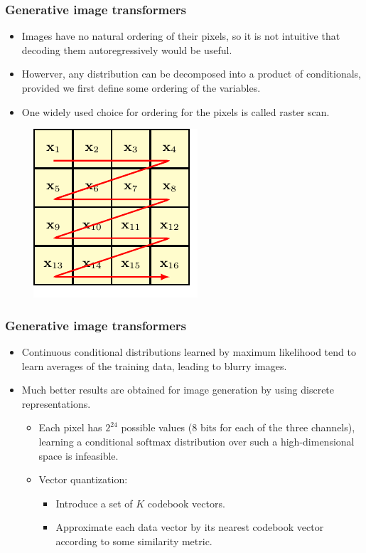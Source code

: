 \documentclass{beamer}
\begin{document}
\begin{frame}
    \frametitle{Generative image transformers}
    \begin{itemize}
        \item Images have no natural ordering of their pixels, so it is not intuitive that decoding them autoregressively would be useful.
        \item Howerver, any distribution can be decomposed into a product of conditionals, provided we first define some ordering of the variables.
        \item One widely used choice for ordering for the pixels is called raster scan.
    \end{itemize}
    \begin{figure}
        \includegraphics{Figure_23.pdf}
    \end{figure}
\end{frame}

\begin{frame}
    \frametitle{Generative image transformers}
    \begin{itemize}
        \item Continuous conditional distributions learned by maximum likelihood tend to learn averages of the training data, leading to blurry images.
        \item Much better results are obtained for image generation by using discrete representations.
        \begin{itemize}
            \item Each pixel has $2^{24}$ possible values ($8$ bits for each of the three channels), learning a conditional $\mathrm{softmax}$ distribution over such a high-dimensional space is infeasible.
            \item Vector quantization:
            \begin{itemize}
                \item Introduce a set of $K$ codebook vectors.
                \item Approximate each data vector by its nearest codebook vector according to some similarity metric.
            \end{itemize}
        \end{itemize}
    \end{itemize}
\end{frame}
\end{document}
